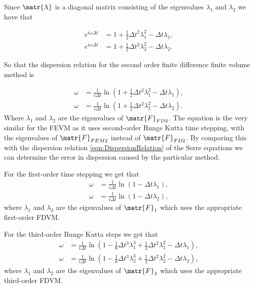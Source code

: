 Since $\matr{\Lambda}$ is a diagonal matrix consisting of the eigenvalues $\lambda_1$ and $\lambda_2$ we have that

\begin{align*}
e^{i\omega\Delta t} &= 1 + \frac{1}{2}\Delta t^2 \lambda_{1}^2  -\Delta t\lambda_{1}, \\
e^{i\omega\Delta t} &= 1 + \frac{1}{2}\Delta t^2 \lambda_{2}^2  -\Delta t\lambda_{2}.
\end{align*}

So that the dispersion relation for the second order finite difference finite volume method is

\begin{align}
\label{eqn:DispersionRelationSecondOrder}
\omega &= \frac{1}{i \Delta t} \ln \left(1 + \frac{1}{2}\Delta t^2 \lambda_{1}^2  -\Delta t\lambda_{1}\right), \\
\omega &= \frac{1}{i \Delta t} \ln \left(1 + \frac{1}{2}\Delta t^2 \lambda_{2}^2  -\Delta t\lambda_{2}\right).
\end{align}
Where $\lambda_{1}$ and $\lambda_{2}$ are the eigenvalues of $\matr{F}_{FD2}$. The equation is the very similar for the FEVM as it uses second-order Runge Kutta time stepping, with the eigenvalues of $\matr{F}_{FEM2}$ instead of $\matr{F}_{FD2}$. By comparing this with the dispersion relation \eqref{eqn:DispersionRelation} of the Serre equations we can determine the error in dispersion caused by the particular method.

For the first-order time stepping we get that
\begin{align}
\label{eqn:DispersionRelationFirstOrder}
\omega &= \frac{1}{i \Delta t} \ln \left(1 -\Delta t\lambda_{1}\right), \\
\omega &= \frac{1}{i \Delta t} \ln \left(1 -\Delta t\lambda_{2}\right),
\end{align}
where $\lambda_1$ and $\lambda_2$ are the eigenvalues of $\matr{F}_1$ which uses the appropriate first-order FDVM.

For the third-order Runge Kutta steps we get that
\begin{align}\label{eqn:DispersionRelationThirdOrder}
\omega &= \frac{1}{i \Delta t} \ln \left(1 - \frac{1}{6}\Delta t^3 \lambda_{1}^3  + \frac{1}{2}\Delta t^2 \lambda_{1}^2  -\Delta t\lambda_{1}\right), \\
\omega &= \frac{1}{i \Delta t} \ln \left(1 - \frac{1}{6}\Delta t^3 \lambda_{2}^3  + \frac{1}{2}\Delta t^2 \lambda_{2}^2  -\Delta t\lambda_{2}\right),
\end{align}
where $\lambda_1$ and $\lambda_2$ are the eigenvalues of $\matr{F}_3$ which uses the appropriate third-order FDVM.


